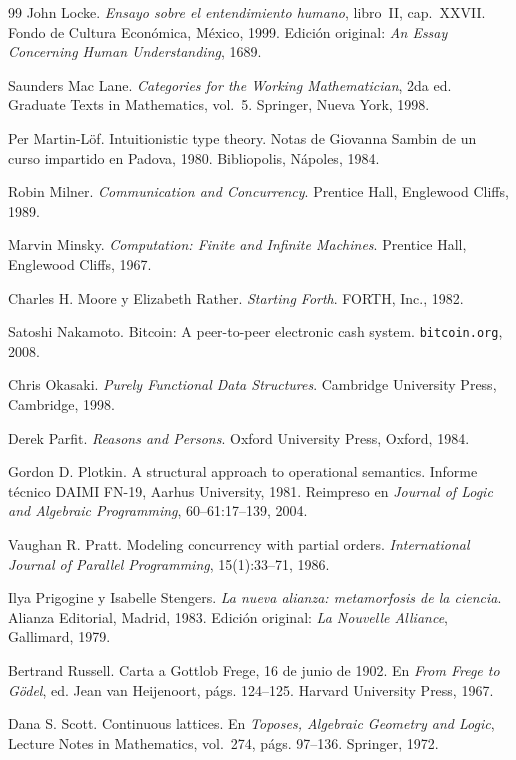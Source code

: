 \documentclass[12pt]{article}
\theoremstyle{plain}
\theoremstyle{definition}
\begin{document}
\begin{thebibliography}{99}
John Locke.
\textit{Ensayo sobre el entendimiento humano}, libro~II, cap.~XXVII.
Fondo de Cultura Económica, México, 1999.
Edición original: \textit{An Essay Concerning Human Understanding}, 1689.

Saunders Mac Lane.
\textit{Categories for the Working Mathematician}, 2da ed.
Graduate Texts in Mathematics, vol.~5.
Springer, Nueva York, 1998.

Per Martin-Löf.
Intuitionistic type theory.
Notas de Giovanna Sambin de un curso impartido en Padova, 1980.
Bibliopolis, Nápoles, 1984.

Robin Milner.
\textit{Communication and Concurrency}.
Prentice Hall, Englewood Cliffs, 1989.

Marvin Minsky.
\textit{Computation: Finite and Infinite Machines}.
Prentice Hall, Englewood Cliffs, 1967.

Charles H. Moore y Elizabeth Rather.
\textit{Starting Forth}.
FORTH, Inc., 1982.

Satoshi Nakamoto.
Bitcoin: A peer-to-peer electronic cash system.
\texttt{bitcoin.org}, 2008.

Chris Okasaki.
\textit{Purely Functional Data Structures}.
Cambridge University Press, Cambridge, 1998.

Derek Parfit.
\textit{Reasons and Persons}.
Oxford University Press, Oxford, 1984.

Gordon D. Plotkin.
A structural approach to operational semantics.
Informe técnico DAIMI FN-19, Aarhus University, 1981.
Reimpreso en \textit{Journal of Logic and Algebraic Programming}, 60--61:17--139, 2004.

Vaughan R. Pratt.
Modeling concurrency with partial orders.
\textit{International Journal of Parallel Programming}, 15(1):33--71, 1986.

Ilya Prigogine y Isabelle Stengers.
\textit{La nueva alianza: metamorfosis de la ciencia}.
Alianza Editorial, Madrid, 1983.
Edición original: \textit{La Nouvelle Alliance}, Gallimard, 1979.

Bertrand Russell.
Carta a Gottlob Frege, 16 de junio de 1902.
En \textit{From Frege to Gödel}, ed. Jean van Heijenoort, págs. 124--125.
Harvard University Press, 1967.

Dana S. Scott.
Continuous lattices.
En \textit{Toposes, Algebraic Geometry and Logic}, Lecture Notes in Mathematics, vol.~274, págs. 97--136.
Springer, 1972.


\end{thebibliography}
\end{document}
